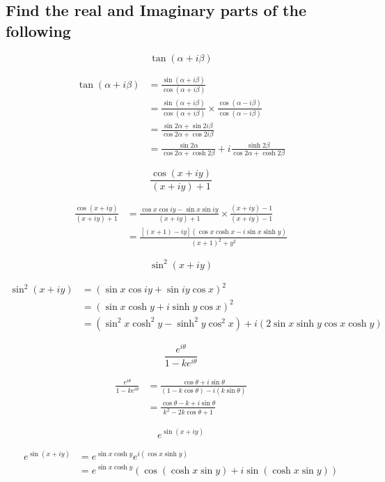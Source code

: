 \subsection{Find the real and Imaginary parts of the following}
\begin{asign}
	\[\tan(\alpha+i\beta)\]
\end{asign}
\begin{anse}
	\[\begin{split}
		\tan(\alpha+i\beta)&=\frac{\sin(\alpha+i\beta)}{\cos(\alpha+i\beta)}\\
		&=\frac{\sin(\alpha+i\beta)}{\cos(\alpha+i\beta)} \times \frac{\cos(\alpha-i\beta)}{\cos(\alpha-i\beta)}\\
		&=\frac{\sin 2\alpha+\sin 2i\beta}{\cos 2\alpha+\cos 2i\beta}\\
		&=\frac{\sin 2\alpha}{\cos 2\alpha+\cosh 2\beta}+i \frac{\sinh 2\beta}{\cos 2\alpha+\cosh 2\beta}
	\end{split}\]
\end{anse}
\begin{asign}
	\[\frac{\cos(x+iy)}{(x+iy)+1}\]
\end{asign}
\begin{anse}
	\[\begin{split}
		\frac{\cos(x+iy)}{(x+iy)+1}&=\frac{\cos x\cos iy-\sin x\sin iy}{(x+iy)+1}\times \frac{(x+iy)-1}{(x+iy)-1}\\
		&=\frac{[(x+1)-iy](\cos x \cosh x-i\sin x\sinh y)}{(x+1)^2+y^2}
	\end{split}\]
\end{anse}
\begin{asign}
	\[\sin^2(x+iy)\]
\end{asign}
\begin{anse}
	\[\begin{split}
		\sin^2(x+iy)&=(\sin x\cos iy+\sin iy\cos x)^2\\
		&=(\sin x\cosh y+i\sinh y\cos x)^2\\
		&=(\sin^2x\cosh^2y-\sinh^2y\cos^2x)+i(2\sin x\sinh y\cos x\cosh y)
	\end{split}\]
\end{anse}
\begin{asign}
	\[\frac{e^{i\theta}}{1-ke^{i\theta}}\]
\end{asign}
\begin{anse}
	\[\begin{split}
		\frac{e^{i\theta}}{1-ke^{i\theta}}&=\frac{\cos\theta+i\sin\theta}{(1-k\cos\theta)-i(k\sin\theta)}\\
		&=\frac{\cos\theta-k+i\sin\theta}{k^2-2k\cos\theta+1}
	\end{split}\]
\end{anse}
\begin{asign}
	\[e^{\sin(x+iy)}\]
\end{asign}
\begin{anse}
	\[\begin{split}
		e^{\sin(x+iy)}&=e^{\sin x\cosh y}e^{i(\cos x\sinh y)}\\
		&=e^{\sin x\cosh y}(\cos(\cosh x\sin y)+i\sin(\cosh x\sin y))
	\end{split}\]
\end{anse}

